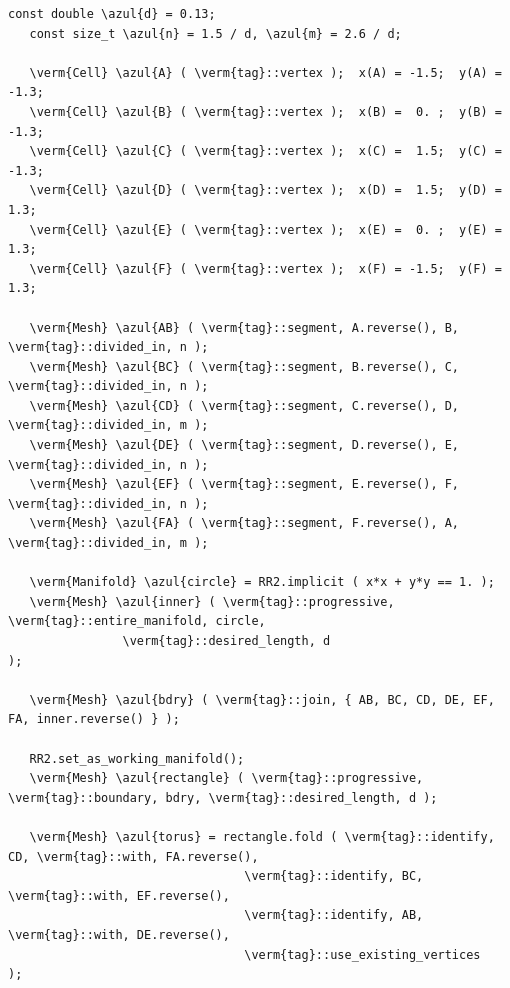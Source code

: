 \begin{Verbatim}[commandchars=\\\{\},formatcom=\small\tt,frame=single,
   label=parag-\ref{\numb section 7.\numb parag 15}.cpp,rulecolor=\color{coment},
   baselinestretch=0.94,framesep=2mm                                             ]
   const double \azul{d} = 0.13;
   const size_t \azul{n} = 1.5 / d, \azul{m} = 2.6 / d;

   \verm{Cell} \azul{A} ( \verm{tag}::vertex );  x(A) = -1.5;  y(A) = -1.3;
   \verm{Cell} \azul{B} ( \verm{tag}::vertex );  x(B) =  0. ;  y(B) = -1.3;
   \verm{Cell} \azul{C} ( \verm{tag}::vertex );  x(C) =  1.5;  y(C) = -1.3;
   \verm{Cell} \azul{D} ( \verm{tag}::vertex );  x(D) =  1.5;  y(D) =  1.3;
   \verm{Cell} \azul{E} ( \verm{tag}::vertex );  x(E) =  0. ;  y(E) =  1.3;
   \verm{Cell} \azul{F} ( \verm{tag}::vertex );  x(F) = -1.5;  y(F) =  1.3;

   \verm{Mesh} \azul{AB} ( \verm{tag}::segment, A.reverse(), B, \verm{tag}::divided_in, n );
   \verm{Mesh} \azul{BC} ( \verm{tag}::segment, B.reverse(), C, \verm{tag}::divided_in, n );
   \verm{Mesh} \azul{CD} ( \verm{tag}::segment, C.reverse(), D, \verm{tag}::divided_in, m );
   \verm{Mesh} \azul{DE} ( \verm{tag}::segment, D.reverse(), E, \verm{tag}::divided_in, n );
   \verm{Mesh} \azul{EF} ( \verm{tag}::segment, E.reverse(), F, \verm{tag}::divided_in, n );
   \verm{Mesh} \azul{FA} ( \verm{tag}::segment, F.reverse(), A, \verm{tag}::divided_in, m );

   \verm{Manifold} \azul{circle} = RR2.implicit ( x*x + y*y == 1. );
   \verm{Mesh} \azul{inner} ( \verm{tag}::progressive, \verm{tag}::entire_manifold, circle,
                \verm{tag}::desired_length, d                         );

   \verm{Mesh} \azul{bdry} ( \verm{tag}::join, { AB, BC, CD, DE, EF, FA, inner.reverse() } );

   RR2.set_as_working_manifold();
   \verm{Mesh} \azul{rectangle} ( \verm{tag}::progressive, \verm{tag}::boundary, bdry, \verm{tag}::desired_length, d );

   \verm{Mesh} \azul{torus} = rectangle.fold ( \verm{tag}::identify, CD, \verm{tag}::with, FA.reverse(),
                                 \verm{tag}::identify, BC, \verm{tag}::with, EF.reverse(),
                                 \verm{tag}::identify, AB, \verm{tag}::with, DE.reverse(),
                                 \verm{tag}::use_existing_vertices                 );
\end{Verbatim}
  

